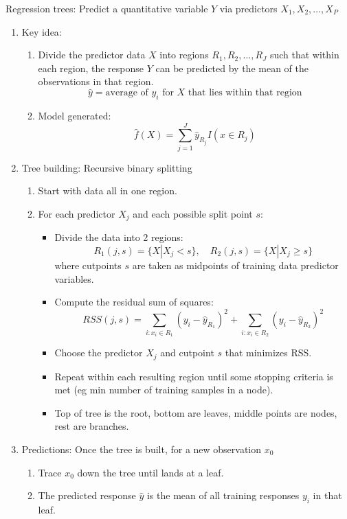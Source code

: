 \documentclass{article}
\begin{document}
Regression trees: Predict a quantitative variable $Y$ via predictors $X_1, X_2, \dots, X_P$ 
\begin{enumerate}
\item Key idea:
\begin{enumerate}
\item Divide the predictor data $X$ into regions $R_1, R_2, \dots, R_J$ such that within each region, the response $Y$ can be predicted by the mean of the observations in that region.
\[
\hat{y} = \text{average of $y_i$ for $X$ that lies within that region}
\]
\item Model generated:
\[
\hat{f}(X) = \sum_{j=1}^J \hat{y}_{R_j} I( x \in R_j)
\]
\end{enumerate}

\item Tree building: Recursive binary splitting
\begin{enumerate}
\item Start with data all in one region.
\item For each predictor $X_j$ and each possible split point $s$:
\begin{itemize}
\item Divide the data into 2 regions:
\[
R_1(j,s) = \{X | X_j<s \}, \quad R_2(j,s) = \{X | X_j \geq s \}
\]
where cutpoints $s$ are taken as midpoints of training data predictor variables.
\item Compute the residual sum of squares:
\[
RSS(j,s) = \sum_{i: x_i \in R_1} (y_i - \hat{y}_{R_1})^2 + \sum_{i: x_i \in R_2} (y_i - \hat{y}_{R_2})^2
\]
\item Choose the predictor $X_j$ and cutpoint $s$ that minimizes RSS.
\item Repeat within each resulting region until some stopping criteria is met (eg min number of training samples in a node).
\item Top of tree is the root, bottom are leaves, middle points are nodes, rest are branches.
\end{itemize}
\end{enumerate}

\item Predictions: Once the tree is built, for a new observation $x_0$
\begin{enumerate}
\item Trace $x_0$ down the tree until lands at a leaf.
\item The predicted response $\hat{y}$ is the mean of all training responses $y_i$ in that leaf.
\end{enumerate}


\end{enumerate}
\end{document}

